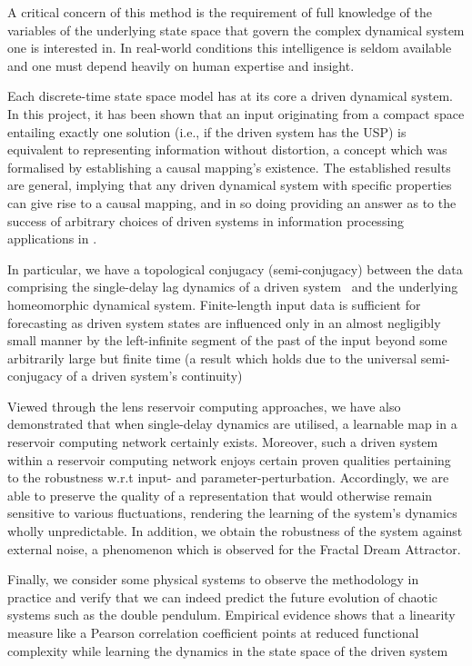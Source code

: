 \documentclass[a4paper,12pt,twoside]{report}
\begin{document}
A critical concern of this method is the requirement of full knowledge of the variables of the underlying state space that govern the complex dynamical system one is interested in. In real-world conditions this intelligence is seldom available and one must depend heavily on human expertise and insight. 

Each discrete-time state space model has at its core a driven dynamical system. In this project, it has been shown that an input originating from a compact space entailing exactly one solution (i.e., if the driven system has the USP) is equivalent to representing information without distortion, a concept which was formalised by establishing a causal mapping’s existence. The established results are general, implying that any driven dynamical system with specific properties can give rise to a causal mapping, and in so doing  providing an answer as to the success of arbitrary choices of driven systems in information processing applications in \cite{jaeger2004harnessing, mass2002realtime}.

In particular, we have a topological conjugacy (semi-conjugacy) between the data comprising the single-delay lag dynamics of a driven system~\cite{manjunath2013echo} and the underlying homeomorphic dynamical system. Finite-length input data is sufficient for forecasting as driven system states are influenced only in an almost negligibly small manner by the left-infinite segment of the past of the input beyond some arbitrarily large but finite time (a result which holds due to the universal semi-conjugacy of a driven system’s continuity)


Viewed through the lens reservoir computing approaches, we have also demonstrated that when single-delay dynamics are utilised, a learnable map in a reservoir computing network certainly exists. Moreover, such a driven system within a reservoir computing network enjoys certain proven qualities pertaining to the robustness w.r.t input- and parameter-perturbation. Accordingly, we are able to preserve the quality of a representation that would otherwise remain sensitive to various fluctuations, rendering the learning of the system’s dynamics wholly unpredictable. In addition, we obtain the robustness of the system against external noise, a phenomenon which is observed for the Fractal Dream Attractor.

Finally, we consider some physical systems to observe the methodology in practice and verify that we can indeed predict the future evolution of chaotic systems such as the double pendulum. Empirical evidence shows that a linearity measure like a Pearson correlation coefficient points at reduced functional complexity while learning the dynamics in the state space of the driven system
\end{document}
